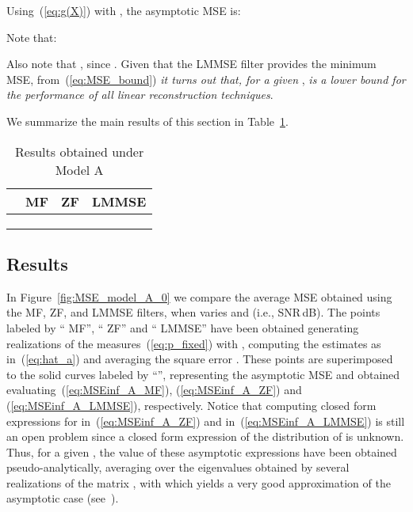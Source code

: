 \documentclass[final, a4paper]{IEEEtran}
\begin{document}
Using~(\ref{eq:g(X)}) with , the asymptotic MSE is:

Note that:

Also note that , since
. Given that the LMMSE filter provides the minimum
MSE, from~(\ref{eq:MSE_bound}) {\em it turns out that, for a given },
 {\em is a lower
bound for the performance of all linear reconstruction techniques}.


We summarize the main results of this section in Table~\ref{table:results-modelA}.

\begin{table}
\begin{center}
\caption{Results obtained under Model A \label{table:results-modelA}}
\begin{tabular}{|l||c|c|c|} \hline
              & \rule[-1.5mm]{0mm}{5mm} { MF} &  { ZF} & { LMMSE} \\ \hline \hline
    & &  \rule[-2mm]{0mm}{6mm}  &   \\ \hline
  &    &
              \rule[-2mm]{0mm}{6mm} 
              &  \\ \hline
    &  &
              \rule[-2mm]{0mm}{6mm} 
              &  \\ \hline
\end{tabular}
\end{center}
\end{table}


\subsection{Results}
In Figure~\ref{fig:MSE_model_A_0} we compare the average MSE obtained using
the MF, ZF, and LMMSE filters, when  varies and  (i.e.,
SNR\,dB). The points labeled by `` MF'', `` ZF'' and ``
LMMSE'' have been obtained generating  realizations of the
measures~(\ref{eq:p_fixed}) with , computing the estimates as
in~(\ref{eq:hat_a}) and averaging the square error .
These points are superimposed to the solid curves labeled by ``'',
representing the asymptotic MSE and obtained evaluating~(\ref{eq:MSEinf_A_MF}), (\ref{eq:MSEinf_A_ZF}) and
(\ref{eq:MSEinf_A_LMMSE}), respectively. Notice that computing closed
form expressions for  in~(\ref{eq:MSEinf_A_ZF}) and
 in~(\ref{eq:MSEinf_A_LMMSE}) is still
an open problem since a closed form expression of the distribution of  is unknown.
Thus, for a given , the value of these
asymptotic expressions have been obtained pseudo-analytically, averaging over the
eigenvalues  obtained by several realizations of the matrix , with 
which yields a very good approximation of the asymptotic case (see~\cite{NordioChiasseriniViterbo}).
\end{document}

